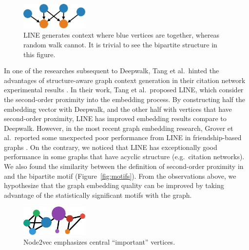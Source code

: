 \documentclass[letterpaper]{article}
\begin{document}
            \begin{figure}
                \centering
                \includegraphics[width=0.3\textwidth]{fig3_line}
                \caption{LINE generates context where blue vertices are together, whereas random walk cannot. It is trivial to see the bipartite structure in this figure.}
                \label{fig:line}
            \end{figure}

            In one of the researches subsequent to Deepwalk, Tang et al.\ hinted the advantages 
            of structure-aware graph context generation in their citation network experimental 
            results \cite{line}. In their work, Tang et al.\ proposed LINE, which consider the
            second-order proximity into the embedding process. By constructing half the embedding
            vector with Deepwalk, and the other half with vertices that have second-order proximity,
            LINE has improved embedding results compare to Deepwalk. However, in the most recent
            graph embedding research, Grover et al.\ reported some unexpected poor performance
            from LINE in friendship-based graphs \cite{node2vec}. On the contrary, we noticed that 
            LINE has exceptionally good performance in some graphs that have acyclic structure 
            (e.g.\ citation networks). We also found the similarity between the definition of 
            second-order proximity in \cite{line} and the bipartite motif (Figure~\ref{fig:motifs}).
            From the observations above, we hypothesize that the graph embedding quality can be
            improved by taking advantage of the statistically significant motifs with the graph.

            \begin{figure}
                \centering
                \includegraphics[width=0.3\textwidth]{fig4_n2v}
                \caption{Node2vec emphasizes central ``important'' vertices.}
                \label{fig:n2v}
            \end{figure}
\end{document}
